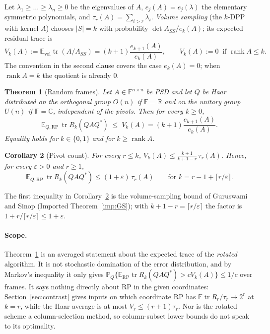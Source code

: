 \documentclass[11pt,a4paper]{article}
\newtheorem{mainthm}{Theorem}
\newtheorem{maincor}[mainthm]{Corollary}
\theoremstyle{definition}
\newcommand{\E}{\mathbb{E}}
\newcommand{\PP}{\mathbb{P}}
\newcommand{\R}{\mathbb{R}}
\newcommand{\C}{\mathbb{C}}
\newcommand{\F}{\mathbb{F}}
\newcommand{\tr}{\operatorname{tr}}
\newcommand{\rank}{\operatorname{rank}}
\newcommand{\vol}{\mathrm{vol}}
\newcommand{\RP}{\mathrm{RP}}
\begin{document}
Let $\lambda_1\ge\dots\ge\lambda_n\ge0$ be the eigenvalues of $A$, $e_j(A)=e_j(\lambda)$ the elementary symmetric polynomials, and $\tau_r(A)=\sum_{i>r}\lambda_i$. \emph{Volume sampling} (the $k$-DPP with kernel $A$) chooses $|S|=k$ with probability $\det A_{SS}/e_k(A)$; its expected residual trace is \cite{DRVW}
\begin{equation}\label{eq:Vk}
V_k(A):=\E_{\vol}\tr(A/A_{SS})=(k+1)\frac{e_{k+1}(A)}{e_k(A)},\qquad V_k(A):=0\ \text{ if } \rank A\le k.
\end{equation}
The convention in the second clause covers the case $e_k(A)=0$; when $\rank A=k$ the quotient is already $0$.

\begin{mainthm}[Random frames]\label{thm:A}
Let $A\in\F^{n\times n}$ be PSD and let $Q$ be Haar distributed on the orthogonal group $O(n)$ if $\F=\R$ and on the unitary group $U(n)$ if $\F=\C$, independent of the pivots. Then for every $k\ge0$,
\[
\E_{Q,\RP}\,\tr R_k(QAQ^*)\;\le\;V_k(A)=(k+1)\frac{e_{k+1}(A)}{e_k(A)}.
\]
Equality holds for $k\in\{0,1\}$ and for $k\ge\rank A$.
\end{mainthm}

\begin{maincor}[Pivot count]\label{cor:B}
For every $r\le k$, $V_k(A)\le\frac{k+1}{k+1-r}\,\tau_r(A)$. Hence, for every $\varepsilon>0$ and $r\ge1$,
\[
\E_{Q,\RP}\,\tr R_k(QAQ^*)\le(1+\varepsilon)\,\tau_r(A)\qquad\text{for } k=r-1+\lceil r/\varepsilon\rceil .
\]
\end{maincor}

The first inequality in Corollary~\ref{cor:B} is the volume-sampling bound of Guruswami and Sinop \cite{GS} (Imported Theorem~\ref{imp:GS}); with $k+1-r=\lceil r/\varepsilon\rceil$ the factor is $1+r/\lceil r/\varepsilon\rceil\le1+\varepsilon$.

\paragraph{Scope.} Theorem~\ref{thm:A} is an averaged statement about the expected trace of the \emph{rotated} algorithm. It is not stochastic domination of the error distribution, and by Markov's inequality it only gives $\PP_Q\{\E_{\RP}\tr R_k(QAQ^*)>cV_k(A)\}\le1/c$ over frames. It says nothing directly about RP in the given coordinates: Section~\ref{sec:contrast} gives inputs on which coordinate RP has $\E\tr R_r/\tau_r\to2^r$ at $k=r$, while the Haar average is at most $V_r\le(r+1)\tau_r$. Nor is the rotated scheme a column-selection method, so column-subset lower bounds do not speak to its optimality.
\end{document}
